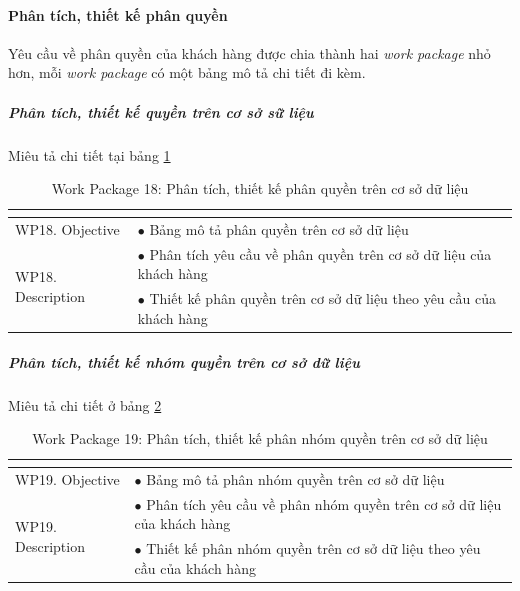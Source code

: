 \documentclass[a4paper]{book}
\begin{document}
\paragraph{Phân tích, thiết kế phân quyền}
Yêu cầu về phân quyền của khách hàng được chia thành hai \textit{work package} nhỏ hơn, mỗi \textit{work package} có một bảng mô tả chi tiết đi kèm.
\subparagraph{Phân tích, thiết kế quyền trên cơ sở sữ liệu} Miêu tả chi tiết tại bảng \ref{table:baomat_thietke_phanquyen}
\begin{table}[h!]
	\begin{center}
		\begin{tabular}{|p{4cm}|p{10cm}|}
			\hline
			\multicolumn{2}{|c|}{\cellcolor[HTML]{363636}{\color[HTML]{FFFFFF}Work package 18: Phân tích, thiết kế phân quyền trên cơ sở dữ liệu}}\\
			\hline
			\multirow{1}{*}{WP18. Objective} & $\bullet$ Bảng mô tả phân quyền trên cơ sở dữ liệu\\
			\hline
			\multirow{2}{*}{WP18. Description} & $\bullet$ Phân tích yêu cầu về phân quyền trên cơ sở dữ liệu của khách hàng \\
			& $\bullet$ Thiết kế phân quyền trên cơ sở dữ liệu theo yêu cầu của khách hàng\\
			\hline
		\end{tabular}
		\caption{Work Package 18: Phân tích, thiết kế phân quyền trên cơ sở dữ liệu}
		\label{table:baomat_thietke_phanquyen}
	\end{center}
\end{table}
\pagebreak
\subparagraph{Phân tích, thiết kế nhóm quyền trên cơ sở dữ liệu} Miêu tả chi tiết ở bảng \ref{table:baomat_thietke_phannhomquyen}
\begin{table}[h!]
	\begin{center}
		\begin{tabular}{|p{4cm}|p{10cm}|}
			\hline
			\multicolumn{2}{|c|}{\cellcolor[HTML]{363636}{\color[HTML]{FFFFFF}Work package 19: Phân tích, thiết kế phân nhóm quyền trên cơ sở dữ liệu}}\\
			\hline
			\multirow{1}{*}{WP19. Objective} & $\bullet$ Bảng mô tả phân nhóm quyền trên cơ sở dữ liệu\\
			\hline
			\multirow{2}{*}{WP19. Description} & $\bullet$ Phân tích yêu cầu về phân nhóm quyền trên cơ sở dữ liệu của khách hàng \\
			& $\bullet$ Thiết kế phân nhóm quyền trên cơ sở dữ liệu theo yêu cầu của khách hàng\\
			\hline
		\end{tabular}
		\caption{Work Package 19: Phân tích, thiết kế phân nhóm quyền trên cơ sở dữ liệu}
		\label{table:baomat_thietke_phannhomquyen}
	\end{center}
\end{table}
\end{document}
